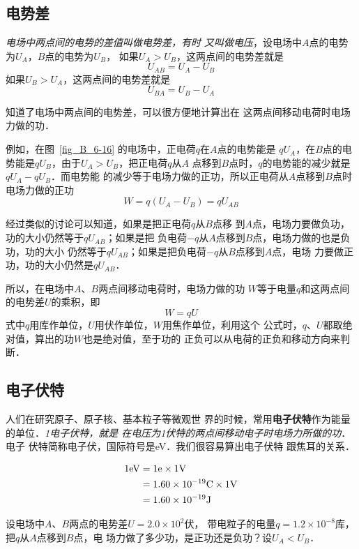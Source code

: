 \subsection{电势差}
\textit{电场中两点间的电势的差值叫做电势差，有时
又叫做电压}，设电场中$A$点的电势为$U_A$，$B$点的电势为$U_B$，
如果$U_A>U_B$，这两点间的电势差就是
\[U_{AB}=U_A-U_B \]
如果$U_B>U_A$，这两点间的电势差就是
\[U_{BA}=U_B-U_A \]

知道了电场中两点间的电势差，可以很方便地计算出在
这两点间移动电荷时电场力做的功．

例如，在图~\ref{fig_B_6-16} 的电场中，正电荷$q$在$A$点的电势能是
$qU_A$，在$B$点的电势能是$qU_B$，由于$U_A>U_B$，把正电荷$q$从$A$
点移到$B$点时，$q$的电势能的减少就是$qU_A-qU_B$．而电势能
的减少等于电场力做的正功，所以正电荷从$A$点移到$B$点时
电场力做的正功
\[W=q(U_A-U_B)=qU_{AB}\]

经过类似的讨论可以知道，如果是把正电荷$q$从$B$点移
到$A$点，电场力要做负功，功的大小仍然等于$qU_{AB}$；如果是把
负电荷$-q$从$A$点移到$B$点，电场力做的也是负功，功的大小
仍然等于$qU_{AB}$；如果是把负电荷$-q$从$B$点移到$A$点，电场
力要做正功，功的大小仍然是$qU_{AB}$．

所以，在电场中$A$、$B$两点间移动电荷时，电场力做的功
$W$等于电量$q$和这两点间的电势差$U$的乘积，即
\[W=qU\]
式中$q$用库作单位，$U$用伏作单位，$W$用焦作单位，利用这个
公式时，$q$、$U$都取绝对值，算出的功$W$也是绝对值，至于功的
正负可以从电荷的正负和移动方向来判断．

\subsection{电子伏特}


人们在研究原子、原子核、基本粒子等微观世
界的时候，常用\textbf{电子伏特}作为能量的单位．\textit{1电子伏特，就是
在电压为1伏特的两点间移动电子时电场力所做的功}．
电子
伏特简称电子伏，国际符号是eV．我们很容易算出电子伏特
跟焦耳的关系．

\[\begin{split}
    1{\rm eV}&=1{\rm e}\times 1{\rm V}\\
    &=1.60\times 10^{-19}{\rm C}\times 1{\rm V}\\
&=1.60\times 10^{-19}{\rm J}    
\end{split}    \]


\begin{example}
    设电场中$A$、$B$两点的电势差$U=2.0\times10^2$伏，
    带电粒子的电量$q=1.2\times10^{-8}$库，把$q$从$A$点移到$B$点，电
    场力做了多少功，是正功还是负功？设$U_A<U_B$．
\end{example}

